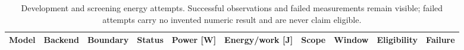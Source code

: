 \begin{table}[t]
\centering
\small
\caption{Development and screening energy attempts. Successful observations and failed measurements remain visible; failed attempts carry no invented numeric result and are never claim eligible.}
\label{tab:screening-energy-observations}
\begin{tabular}{lrrrrrrrrr}
\toprule
Model & Backend & Boundary & Status & Power [W] & Energy/work [J] & Scope & Window & Eligibility & Failure \\
\midrule
\bottomrule
\end{tabular}
\end{table}
